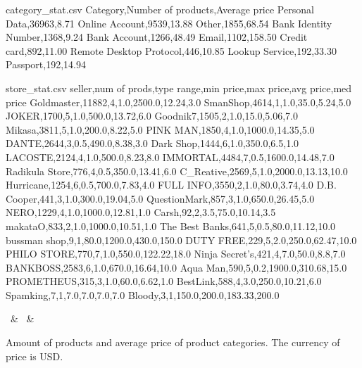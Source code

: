 \begin{filecontents*}[overwrite]{category_stat.csv}
    Category,Number of products,Average price
    Personal Data,36963,8.71
    Online Account,9539,13.88
    Other,1855,68.54
    Bank Identity Number,1368,9.24
    Bank Account,1266,48.49
    Email,1102,158.50
    Credit card,892,11.00
    Remote Desktop Protocol,446,10.85
    Lookup Service,192,33.30
    Passport,192,14.94
\end{filecontents*}

\begin{filecontents*}[overwrite]{store_stat.csv}
    seller,num of prods,type range,min price,max price,avg price,med price
    Goldmaster,11882,4,1.0,2500.0,12.24,3.0
    SmanShop,4614,1,1.0,35.0,5.24,5.0
    JOKER,1700,5,1.0,500.0,13.72,6.0
    Goodnik7,1505,2,1.0,15.0,5.06,7.0
    Mikasa,3811,5,1.0,200.0,8.22,5.0
    PINK MAN,1850,4,1.0,1000.0,14.35,5.0
    DANTE,2644,3,0.5,490.0,8.38,3.0
    Dark Shop,1444,6,1.0,350.0,6.5,1.0
    LACOSTE,2124,4,1.0,500.0,8.23,8.0
    IMMORTAL,4484,7,0.5,1600.0,14.48,7.0
    Radikula Store,776,4,0.5,350.0,13.41,6.0
    C\_Reative,2569,5,1.0,2000.0,13.13,10.0
    Hurricane,1254,6,0.5,700.0,7.83,4.0
    FULL INFO,3550,2,1.0,80.0,3.74,4.0
    D.B. Cooper,441,3,1.0,300.0,19.04,5.0
    QuestionMark,857,3,1.0,650.0,26.45,5.0
    NERO,1229,4,1.0,1000.0,12.81,1.0
    Carsh,92,2,3.5,75.0,10.14,3.5
    makataO,833,2,1.0,1000.0,10.51,1.0
    The Best Banks,641,5,0.5,80.0,11.12,10.0
    bussman shop,9,1,80.0,1200.0,430.0,150.0
    DUTY FREE,229,5,2.0,250.0,62.47,10.0
    PHILO STORE,770,7,1.0,550.0,122.22,18.0
    Ninja Secret's,421,4,7.0,50.0,8.8,7.0
    BANKBOSS,2583,6,1.0,670.0,16.64,10.0
    Aqua Man,590,5,0.2,1900.0,310.68,15.0
    PROMETHEUS,315,3,1.0,60.0,6.62,1.0
    BestLink,588,4,3.0,250.0,10.21,6.0
    Spamking,7,1,7.0,7.0,7.0,7.0
    Bloody,3,1,150.0,200.0,183.33,200.0
\end{filecontents*}

\begin{table*}[h!]
    \centering
    {\cate\ & \amount\ & \avg}%
    \caption{Amount of products and average price of product categories. The currency of price is USD.}
    \label{tab:category_stat}
\end{table*}

